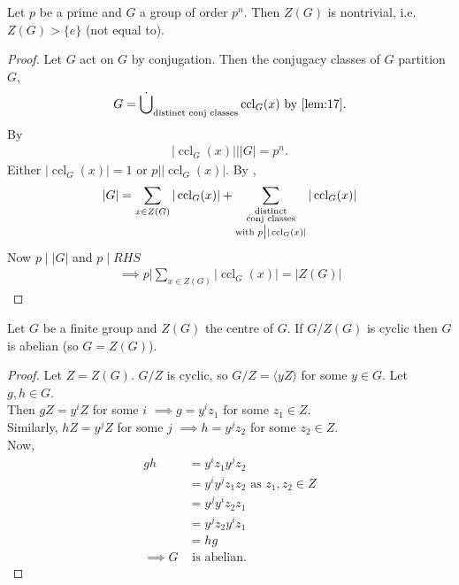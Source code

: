 \begin{proposition}\label{prp:7}
    Let $p$ be a prime and $G$ a group of order $p^n$.
    Then $Z(G)$ is nontrivial, i.e. $Z(G) > \{e\}$ (not equal to).
\end{proposition} 

\begin{proof}
    Let $G$ act on $G$ by conjugation.
    Then the conjugacy classes of $G$ partition $G$,
    \begin{align*}
        G = \mathbin{\dot{\bigcup}}_{\text{distinct conj classes}} \operatorname{ccl}_G(x) \text{ by \Cref{lem:17}}.
    \end{align*} 
    By  
    \begin{align*}
        |\operatorname{ccl}_G(x)| \mathbin{\bigg|} |G| = p^n.
    \end{align*} 
    Either $|\operatorname{ccl}_G(x)| = 1$ or $p \mathbin{\bigg|} |\operatorname{ccl}_G(x)|$.
    By , 
    \begin{align*}
        |G| = \sum_{x \in Z(G)} |\operatorname{ccl}_G(x)| + \sum_{\substack{\text{distinct} \\ \text{conj classes} \\ \text{with } p \bigm| |\operatorname{ccl}_G(x)|}} |\operatorname{ccl}_G(x)|
    \end{align*} 
    Now $p \mid |G|$ and $p \mid RHS$
    \begin{align*}
        \implies p \mathbin{\bigg|} \sum_{x \in Z(G)} |\operatorname{ccl}_G(x)| = |Z(G)|
    \end{align*} 
\end{proof} 

\begin{lemma} \label{lem:19}
    Let $G$ be a finite group and $Z(G)$ the centre of $G$.
    If $G / Z(G)$ is cyclic then $G$ is abelian (so $G = Z(G)$).
\end{lemma} 

\begin{proof}
    Let $Z = Z(G)$.
    $G / Z$ is cyclic, so $G / Z = \langle y Z \rangle$ for some $y \in G$.
    Let $g, h \in G$. \\
    Then $gZ = y^i Z$ for some $i$ $\implies g = y^i z_1$ for some $z_1 \in Z$. \\
    Similarly, $hZ = y^j Z$ for some $j$ $\implies h = y^j z_2$ for some $z_2 \in Z$. \\
    Now, 
    \begin{align*}
        gh &= y^i z_1 y^j z_2 \\
        &= y^i y^j z_1 z_2 \text{ as $z_1, z_2 \in Z$} \\
        &= y^j y^i z_2 z_1 \\
        &= y^j z_2 y^i z_1 \\
        &= hg \\
        \implies G &\text{ is abelian}.
    \end{align*} 
\end{proof} 

